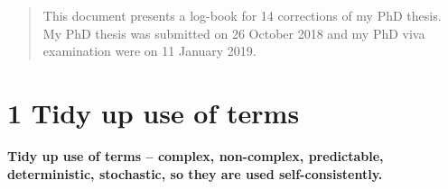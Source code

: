 \documentclass[12pt]{article}
\begin{document}
\maketitle


\begin{abstract}
This document presents a log-book for 14 corrections 
of my PhD thesis. 
My PhD thesis was submitted on 26 October 2018 and
 my PhD viva examination were on 11 January 2019.
\end{abstract}





\section*{1  Tidy up use of terms}
\textbf{
	Tidy up use of terms -- complex, non-complex, predictable, 
	deterministic, stochastic, so they are used self-consistently.
}
\end{document}
